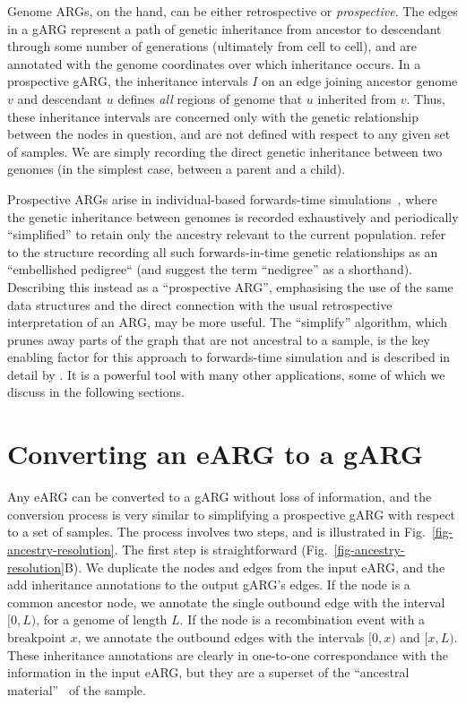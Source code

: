 \documentclass{article}
\begin{document}
Genome ARGs, on the hand,
can be either retrospective or \emph{prospective}.
The edges in a gARG represent a path of genetic inheritance from
ancestor to descendant through some
number of generations (ultimately from cell to cell),
and are annotated
with the genome coordinates over which inheritance occurs.
In a prospective gARG, the inheritance intervals $I$
on an edge joining ancestor genome $v$ and descendant $u$
defines \emph{all} regions of genome that $u$ inherited from $v$.
Thus, these  inheritance intervals are
concerned only with the genetic relationship
between the nodes in question, and are not defined with respect
to any given set of samples. We are simply recording the
direct genetic inheritance between two genomes
(in the simplest case, between a parent and a child).

Prospective ARGs arise in individual-based forwards-time
simulations~\citep{kelleher2018efficient,haller2018tree},
where the genetic inheritance between genomes is recorded
exhaustively and periodically
``simplified'' to retain only
the ancestry relevant to the current population.
\citet{kelleher2018efficient} refer to the structure
recording all such forwards-in-time genetic relationships
as an ``embellished pedigree`` (and suggest the term ``nedigree'' as a shorthand).
Describing this instead as a ``prospective ARG'', emphasising
the use of the same data structures and the direct connection with
the usual retrospective interpretation of an ARG, may be
more useful.
The ``simplify'' algorithm, which prunes away parts of the graph that
are not ancestral to a sample, is the key enabling factor for
this approach to forwards-time simulation and is
described in detail by
\citet{kelleher2018efficient}. It is a
powerful tool with many other applications,
some of which we discuss in the following sections.

\section*{Converting an eARG to a gARG}
Any eARG can be converted to a gARG without loss of information,
and the conversion process is very similar to
simplifying a prospective gARG with respect to a set of samples.
The process involves two steps, and is illustrated in
Fig.~\ref{fig-ancestry-resolution}.
The first step is straightforward
(Fig.~\ref{fig-ancestry-resolution}B).
We duplicate the nodes and
edges from the input eARG, and the add inheritance annotations
to the output gARG's edges. If the node is a common ancestor node,
we annotate the single outbound edge with the interval $[0,L)$,
for a genome of length $L$.
If the node is a recombination event with a breakpoint $x$,
we annotate the outbound edges with the intervals $[0, x)$
and $[x, L)$.
These inheritance annotations are clearly in one-to-one
correspondance with the information in the input eARG,
but they are a superset of the
``ancestral material''~\citep{wiuf1999ancestry,wiuf1999recombination}
of the sample.
\end{document}
